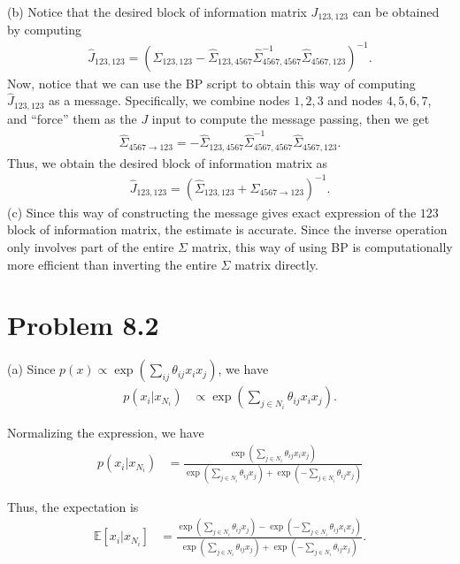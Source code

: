 \documentclass{article}
\begin{document}
\noindent
(b)
%
Notice that the desired block of information matrix $J_{123,123}$
can be obtained by computing
\begin{align*}
	\hat{J}_{123,123} = (\hat{\Sigma}_{123, 123} - \hat{\Sigma}_{123,4567}\hat{\Sigma}_{4567, 4567}^{-1}\hat{\Sigma}_{4567, 123})^{-1}.
\end{align*}
%
Now, notice that we can use the BP script to obtain this way of computing $\hat{J}_{123,123}$ as a message. Specifically, we combine nodes $1,2,3$ and nodes $4,5,6,7$, and ``force'' them as
the $J$ input to compute the message passing, then we get
\begin{align*}
	\hat{\Sigma}_{4567\to 123} = -\hat{\Sigma}_{123,4567}\hat{\Sigma}_{4567, 4567}^{-1}\hat{\Sigma}_{4567, 123}.
\end{align*}
%
Thus, we obtain the desired block of information matrix as
\begin{align*}
	\hat{J}_{123,123} = (\hat{\Sigma}_{123, 123} + \hat{\Sigma}_{4567\to 123})^{-1}.
\end{align*}
\noindent
(c)
%
Since this way of constructing the message gives exact expression
of the $123$ block of information matrix, the estimate is accurate. Since the inverse operation only involves part of the entire $\Sigma$ matrix, this way of using BP is computationally more efficient than inverting the entire $\Sigma$ matrix directly.

\pagebreak
\section*{Problem 8.2}
(a) Since $p(x) \propto \exp\left(\sum_{ij}\theta_{ij} x_i x_j\right)$,
we have
\begin{align*}
p(x_i | x_{N_i}) &\propto \exp\left(\sum_{j\in N_i}\theta_{ij} x_i x_j\right).
\end{align*}
%

Normalizing the expression, we have
\begin{align}
p(x_i | x_{N_i}) &= \frac{\exp\left(\sum_{j\in N_i}\theta_{ij} x_i x_j\right)}
{\exp\left(\sum_{j\in N_i}\theta_{ij} x_j\right) +
\exp\left(-\sum_{j\in N_i}\theta_{ij} x_j\right)} \label{eq:82a_prob}
\end{align}

Thus, the expectation is
\begin{align}
	\mathbb{E}[x_i | x_{N_i}] &= \frac{
\exp\left(\sum_{j\in N_i}\theta_{ij}x_j\right) - 
\exp\left(-\sum_{j\in N_i}\theta_{ij} x_i x_j\right)}
{\exp\left(\sum_{j\in N_i}\theta_{ij} x_j\right) +
\exp\left(-\sum_{j\in N_i}\theta_{ij} x_j\right)}. \label{eq:82a_exp}
\end{align}
\\
\end{document}
